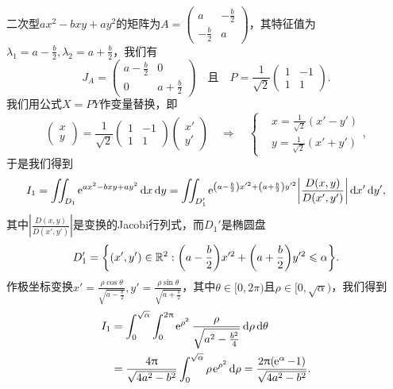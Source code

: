\begin{solution}
  \begin{inparaenum}[(a)]
    \item 二次型$ax^2-bxy+ay^2$的矩阵为$A=\begin{pmatrix}
          a & - \frac b2 \\
          -\frac b2 & a
        \end{pmatrix}$，其特征值为$\lambda_1=a-\frac b2,\lambda_2=a+\frac b2$，我们有
        \[
          J_A = \begin{pmatrix}
            a - \frac b2 & 0 \\
            0 & a + \frac b2
          \end{pmatrix}\quad \text{且} \quad
          P = \frac1{\sqrt2} \begin{pmatrix}
            1 & -1 \\
            1 & 1
          \end{pmatrix}.
        \]
    我们用公式$X=PY$作变量替换，即
    \[
      \begin{pmatrix}
        x \\
        y
      \end{pmatrix} =
      \frac1{\sqrt2}
      \begin{pmatrix}
            1 & -1 \\
            1 & 1
      \end{pmatrix}
      \begin{pmatrix}
        x' \\
        y'
      \end{pmatrix} \quad \Rightarrow \quad
      \left\{
        \begin{aligned}
          & x = \frac1{\sqrt2}(x' - y') \\
          & y = \frac1{\sqrt2}(x' + y')
        \end{aligned}
      \right.,
    \]
    于是我们得到
    \[
      I_1 = \iint_{D_1} \ee^{ax^2-bxy+ay^2} \dif x\dif y = \iint_{D_1'} \ee^{\left(a-\frac b2 \right)x'^2+\left(a+\frac b2\right)y'^2}
      \left| \frac{D(x,y)}{D(x',y')} \right| \dif x'\dif y',
    \]
    其中$\left| \frac{D(x,y)}{D(x',y')} \right|$是变换的Jacobi行列式，而$D_1'$是椭圆盘
    \[
      D_1' = \left\{ (x',y')\in\MR^2: \left( a - \frac b2\right)x'^2 + \left( a + \frac b2 \right)y'^2 \le \alpha \right\}.
    \]
    作极坐标变换$x'=\frac{\rho\cos\theta}{\sqrt{a-\frac b2}},y'=\frac{\rho\sin\theta}{\sqrt{a+\frac b2}}$，其中$\theta\in[0,2\pi)$且$\rho\in[0,\sqrt\alpha)$，我们得到
    \begin{align*}
      I_1 & = \int_0^{\sqrt\alpha}\int_0^{2\pi} \ee^{\rho^2} \frac{\rho}{\sqrt{a^2 - \frac{b^2}4}}\dif \rho\dif \theta \\
      & = \frac{4\pi}{\sqrt{4a^2-b^2}}
      \int_0^{\sqrt\alpha}\rho\ee^{\rho^2} \dif \rho = \frac{2\pi(\ee^\alpha-1)}{\sqrt{4a^2-b^2}}.
    \end{align*}


\end{inparaenum}
\end{solution}
